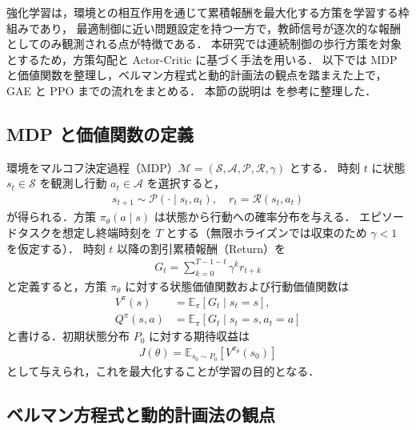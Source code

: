 強化学習は，環境との相互作用を通じて累積報酬を最大化する方策を学習する枠組みであり，
最適制御に近い問題設定を持つ一方で，教師信号が逐次的な報酬としてのみ観測される点が特徴である．
本研究では連続制御の歩行方策を対象とするため，方策勾配と Actor-Critic に基づく手法を用いる．
以下では MDP と価値関数を整理し，ベルマン方程式と動的計画法の観点を踏まえた上で，
GAE と PPO までの流れをまとめる．
本節の説明は\cite{Saito2022DeepLearning4} を参考に整理した．

\subsection{MDP と価値関数の定義}
\label{subsec:MDP}

環境をマルコフ決定過程（MDP）$\mathcal{M}=(\mathcal{S},\mathcal{A},\mathcal{P},\mathcal{R},\gamma)$ とする．
時刻 $t$ に状態 $s_t\in\mathcal{S}$ を観測し行動 $a_t\in\mathcal{A}$ を選択すると，
\begin{align}
  s_{t+1}\sim \mathcal{P}(\cdot\mid s_t,a_t),\quad r_t=\mathcal{R}(s_t,a_t)
\end{align}
が得られる．方策 $\pi_\theta(a\mid s)$ は状態から行動への確率分布を与える．
エピソードタスクを想定し終端時刻を $T$ とする（無限ホライズンでは収束のため $\gamma<1$ を仮定する）．
時刻 $t$ 以降の割引累積報酬（Return）を
\begin{align}
  G_t = \sum_{k=0}^{T-1-t}\gamma^{k} r_{t+k}
  \label{eq:return_def}
\end{align}
と定義すると，方策 $\pi_\theta$ に対する状態価値関数および行動価値関数は
\begin{align}
  V^\pi(s)
   & = \mathbb{E}_{\pi}\left[G_t \mid s_t=s\right],
  \label{eq:v_def}                                        \\
  Q^\pi(s,a)
   & = \mathbb{E}_{\pi}\left[G_t \mid s_t=s, a_t=a\right]
  \label{eq:q_def}
\end{align}
と書ける．初期状態分布 $P_0$ に対する期待収益は
\begin{align}
  J(\theta)=\mathbb{E}_{s_0\sim P_0}\left[V^{\pi_\theta}(s_0)\right]
\end{align}
として与えられ，これを最大化することが学習の目的となる．

\subsection{ベルマン方程式と動的計画法の観点}
\label{subsec:bellman}

